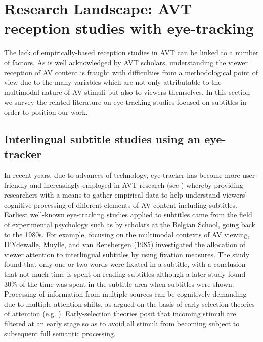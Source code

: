 \documentclass[output=paper]{langsci/langscibook}
\begin{document}
\section{Research Landscape: AVT reception studies with eye-tracking}

The lack of empirically-based reception studies in AVT can be linked to a number of factors. As is well acknowledged by AVT scholars, understanding the viewer reception of AV content is fraught with difficulties from a methodological point of view due to the many variables which are not only attributable to the multimodal nature of AV stimuli but also to viewers themselves.  In this section we survey the related literature on eye-tracking studies focused on subtitles in order to position our work.    

\subsection{Interlingual subtitle studies using an eye-tracker}

In recent years, due to advances of technology, eye-tracker has become more user-friendly and increasingly employed in AVT research (see \citet{perego2012}) whereby providing researchers with a means to gather empirical data to help understand viewers' cognitive processing of different elements of AV content including subtitles. Earliest well-known eye-tracking studies applied to subtitles came from the field of experimental psychology such as by scholars at the Belgian School, going back to the 1980s. For example, focusing on the multimodal contexts of AV viewing, D'Ydewalle, Muylle, and van Rensbergen (1985) investigated the allocation of viewer attention to interlingual subtitles by using fixation measures. The study found that only one or two words were fixated in a subtitle, with a conclusion that not much time is spent on reading subtitles although a later study \citep{dydewalle1987} found 30\% of the time was spent in the subtitle area when subtitles were shown. Processing of information from multiple sources can be cognitively demanding due to multiple attention shifts, as argued on the basis of early-selection theories of attention (e.g. \citet{Treisman1968}). Early-selection theories posit that incoming stimuli are filtered at an early stage so as to avoid all stimuli from becoming subject to subsequent full semantic processing.  
\end{document}
